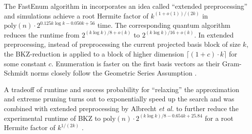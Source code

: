 The FastEnum algorithm in \citet{ABFKSW20} incorporates an idea called ``extended preprocessing'' and simulations achieve a root Hermite factor of $k^{(1 + o(1))/(2k)}$ in $\text{poly}(n) \cdot 2^{0.125k \log k - 0.050k + 56}$ time. The corresponding quantum algorithm reduces the runtime from $2^{(k \log k)/8 + o(k)}$ to $2^{(k \log k) / 16 + o(k)}$. In extended preprocessing, instead of preprocessing the current projected basis block of size $k$, the BKZ-reduction is applied to a block of higher dimension $\lceil (1+c)\cdot k\rceil$ for some constant $c$. Enumeration is faster on the first basis vectors as their Gram-Schmidt norms closely follow the Geometric Series Assumption \cite{MW16}. %

A tradeoff of runtime and success probability for ``relaxing'' the approximation and extreme pruning turns out to exponentially speed up the search \cite{LN20} and was combined with extended preprocessing by Albrecht \textit{et al.} to further reduce the experimental runtime of BKZ to $\text{poly}(n) \cdot 2^{(k \log k)/8 - 0.654k + 25.84}$ for a root Hermite factor of $k^{1/(2k)}$ \cite{ABFKSW20}.






